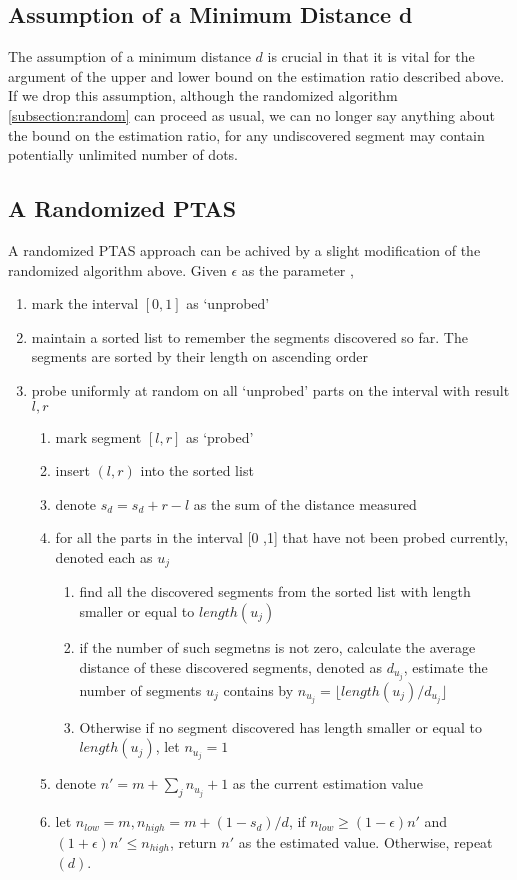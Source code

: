 \documentclass[titlepage]{article}
\begin{document}
\subsection{Assumption of a Minimum Distance d}
The assumption of a minimum distance $d$ is crucial in that it is vital for the argument of the upper and lower bound on the estimation ratio described above. If we drop this assumption, although the randomized algorithm \ref{subsection:random} can proceed as usual, we can no longer say anything about the bound on the estimation ratio, for any undiscovered segment may contain potentially unlimited number of dots.

\subsection{A Randomized PTAS}
A randomized PTAS approach can be achived by a slight modification of the randomized algorithm above. Given $\epsilon$ as the parameter ,
\begin{enumerate}
	\item mark the interval $[0, 1]$ as `unprobed'
	\item maintain a sorted list to remember the segments discovered so far. The segments are sorted by their length on ascending order
	\item probe uniformly at random on all `unprobed' parts on the interval with result $l, r$
		\begin{enumerate}
			\item mark segment $[l, r]$ as `probed'
			\item insert $(l, r)$ into the sorted list
			\item denote $s_d = s_d + r - l$ as the sum of the distance measured
			\item for all the parts in the interval [0 ,1] that have not been probed currently, denoted each as $u_j$
			\begin{enumerate}	
			\item find all the discovered segments from the sorted list with length smaller or equal to $length(u_j)$
			\item if the number of such segmetns is not zero, calculate the average distance of these discovered segments, denoted as $d_{u_j}$, estimate the number of segments $u_j$ contains by $n_{u_j} = \lfloor length(u_j) / d_{u_j} \rfloor$
			\item Otherwise if no segment discovered has length smaller or equal to $length(u_j)$, let $n_{u_j} = 1$
		\end{enumerate}
			\item denote $n' = m + \sum_{j}n_{u_j} + 1$ as the current estimation value
			\item let $n_{low} = m, n_{high} = m + (1 - s_d) / d$, if $n _{low} \geq (1 - \epsilon)n'$ and $(1 + \epsilon)n' \leq n_{high}$, return $n'$ as the estimated value. Otherwise, repeat $(d)$.
		\end{enumerate}
\end{enumerate}
\end{document}
